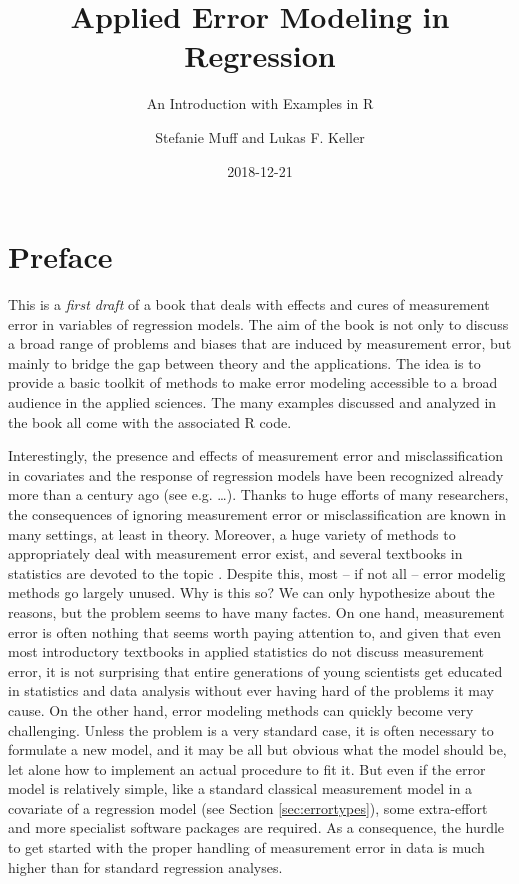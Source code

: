 \documentclass[]{book}
\title{Applied Error Modeling in Regression}
\subtitle{An Introduction with Examples in R}
\author{Stefanie Muff and Lukas F. Keller}
\date{2018-12-21}
\theoremstyle{definition}
\theoremstyle{definition}
\theoremstyle{definition}
\theoremstyle{remark}
\begin{document}
\maketitle

{
\setcounter{tocdepth}{1}
\tableofcontents
}
\chapter*{Preface}\label{preface}

This is a \emph{first draft} of a book that deals with effects and cures
of measurement error in variables of regression models. The aim of the
book is not only to discuss a broad range of problems and biases that
are induced by measurement error, but mainly to bridge the gap between
theory and the applications. The idea is to provide a basic toolkit of
methods to make error modeling accessible to a broad audience in the
applied sciences. The many examples discussed and analyzed in the book
all come with the associated R code.

Interestingly, the presence and effects of measurement error and
misclassification in covariates and the response of regression models
have been recognized already more than a century ago (see e.g.
\ldots{}). Thanks to huge efforts of many researchers, the consequences
of ignoring measurement error or misclassification are known in many
settings, at least in theory. Moreover, a huge variety of methods to
appropriately deal with measurement error exist, and several textbooks
in statistics are devoted to the topic
\citep{fuller1987, gustafson2004, carroll.etal2006, yi2017}. Despite
this, most -- if not all -- error modelig methods go largely unused. Why
is this so? We can only hypothesize about the reasons, but the problem
seems to have many factes. On one hand, measurement error is often
nothing that seems worth paying attention to, and given that even most
introductory textbooks in applied statistics do not discuss measurement
error, it is not surprising that entire generations of young scientists
get educated in statistics and data analysis without ever having hard of
the problems it may cause. On the other hand, error modeling methods can
quickly become very challenging. Unless the problem is a very standard
case, it is often necessary to formulate a new model, and it may be all
but obvious what the model should be, let alone how to implement an
actual procedure to fit it. But even if the error model is relatively
simple, like a standard classical measurement model in a covariate of a
regression model (see Section \ref{sec:errortypes}), some extra-effort
and more specialist software packages are required. As a consequence,
the hurdle to get started with the proper handling of measurement error
in data is much higher than for standard regression analyses.
\end{document}
